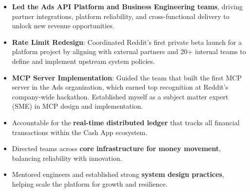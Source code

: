 \documentclass[10pt,a4paper,ragged2e,withhyper]{altacv}
\begin{document}

\makecvheader{}



\begin{paracol}{2}



\begin{itemize}
    \item \textbf{Led the Ads API Platform and Business Engineering teams}, driving partner integrations, platform reliability, and cross-functional delivery to unlock new revenue opportunities. 
    \item \textbf{Rate Limit Redesign}: Coordinated Reddit’s first private beta launch for a platform project by aligning with external partners and 20+ internal teams to define and implement upstream system policies.
    \item \textbf{MCP Server Implementation}: Guided the team that built the first MCP server in the Ads organization, which earned top recognition at Reddit’s company-wide hackathon. Established myself as a subject matter expert (SME) in MCP design and implementation.
\end{itemize}


\divider{}

\begin{itemize}
    \item Accountable for the \textbf{real-time distributed ledger} that tracks all financial transactions within the Cash App ecosystem.
    \item Directed teams across \textbf{core infrastructure for money movement}, balancing reliability with innovation.
    \item Mentored engineers and established strong \textbf{system design practices}, helping scale the platform for growth and resilience.
\end{itemize}


\end{paracol}
\end{document}
